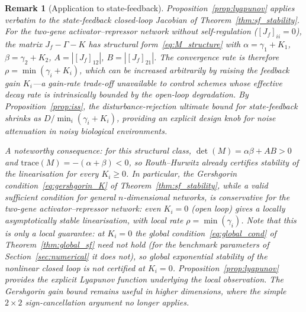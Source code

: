 \documentclass[12pt]{article}
\newtheorem{remark}{Remark}
\begin{document}
\begin{remark}[Application to state-feedback]
\label{rem:lyapunov_sf}
Proposition~\ref{prop:lyapunov} applies verbatim to the state-feedback
closed-loop Jacobian of Theorem~\ref{thm:sf_stability}. For the two-gene
activator--repressor network without self-regulation
($[J_f]_{ii}=0$), the matrix $J_f - \Gamma - K$ has structural
form~\eqref{eq:M_structure} with
$\alpha=\gamma_1+K_1$, $\beta=\gamma_2+K_2$, $A=|[J_f]_{12}|$,
$B=|[J_f]_{21}|$. The convergence rate is therefore
$\rho = \min(\gamma_i+K_i)$, which can be increased arbitrarily by raising
the feedback gain $K_i$---a gain-rate trade-off unavailable to control
schemes whose effective decay rate is intrinsically bounded by the
open-loop degradation. By Proposition~\ref{prop:iss}, the
disturbance-rejection ultimate bound for state-feedback shrinks as
$D/\min_i(\gamma_i+K_i)$, providing an explicit design knob for noise
attenuation in noisy biological environments.

A noteworthy consequence: for this structural class, $\det(M) =
\alpha\beta+AB>0$ and $\mathrm{trace}(M)=-(\alpha+\beta)<0$, so Routh--Hurwitz
already certifies stability of the linearisation for \emph{every}
$K_i\geq 0$. In particular, the Gershgorin
condition~\eqref{eq:gershgorin_K} of Theorem~\ref{thm:sf_stability},
while a valid sufficient condition for general $n$-dimensional networks,
is conservative for the two-gene activator--repressor network: even
$K_i=0$ (open loop) gives a \emph{locally} asymptotically stable
linearisation, with local rate $\rho=\min(\gamma_i)$. Note that this is
only a \emph{local} guarantee: at $K_i=0$ the global
condition~\eqref{eq:global_cond} of Theorem~\ref{thm:global_sf} need not
hold (for the benchmark parameters of Section~\ref{sec:numerical} it does
not), so global exponential stability of the nonlinear closed loop is
not certified at $K_i=0$.
Proposition~\ref{prop:lyapunov} provides the explicit Lyapunov function
underlying the local observation. The Gershgorin gain bound remains
useful in higher dimensions, where the simple $2\times 2$
sign-cancellation argument no longer applies.
\end{remark}
\end{document}
